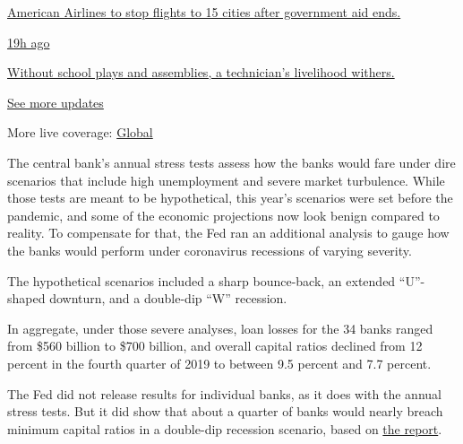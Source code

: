 \href{https://www.nytimes3xbfgragh.onion/live/2020/08/20/business/stock-market-today-coronavirus?action=click\&pgtype=Article\&state=default\&region=MAIN_CONTENT_1\&context=storylines_live_updates\#american-airlines-to-stop-flights-to-15-cities-after-government-aid-ends}{American
Airlines to stop flights to 15 cities after government aid ends.}

\href{https://www.nytimes3xbfgragh.onion/live/2020/08/20/business/stock-market-today-coronavirus?action=click\&pgtype=Article\&state=default\&region=MAIN_CONTENT_1\&context=storylines_live_updates\#without-school-plays-and-assemblies-a-technicians-livelihood-withers}{19h
ago}

\href{https://www.nytimes3xbfgragh.onion/live/2020/08/20/business/stock-market-today-coronavirus?action=click\&pgtype=Article\&state=default\&region=MAIN_CONTENT_1\&context=storylines_live_updates\#without-school-plays-and-assemblies-a-technicians-livelihood-withers}{Without
school plays and assemblies, a technician's livelihood withers.}

\href{https://www.nytimes3xbfgragh.onion/live/2020/08/20/business/stock-market-today-coronavirus?action=click\&pgtype=Article\&state=default\&region=MAIN_CONTENT_1\&context=storylines_live_updates}{See
more updates}

More live coverage:
\href{https://www.nytimes3xbfgragh.onion/2020/08/20/world/coronavirus-covid.html?action=click\&pgtype=Article\&state=default\&region=MAIN_CONTENT_1\&context=storylines_live_updates}{Global}

The central bank's annual stress tests assess how the banks would fare
under dire scenarios that include high unemployment and severe market
turbulence. While those tests are meant to be hypothetical, this year's
scenarios were set before the pandemic, and some of the economic
projections now look benign compared to reality. To compensate for that,
the Fed ran an additional analysis to gauge how the banks would perform
under coronavirus recessions of varying severity.

The hypothetical scenarios included a sharp bounce-back, an extended
``U''-shaped downturn, and a double-dip ``W'' recession.

In aggregate, under those severe analyses, loan losses for the 34 banks
ranged from \$560 billion to \$700 billion, and overall capital ratios
declined from 12 percent in the fourth quarter of 2019 to between 9.5
percent and 7.7 percent.

The Fed did not release results for individual banks, as it does with
the annual stress tests. But it did show that about a quarter of banks
would nearly breach minimum capital ratios in a double-dip recession
scenario, based on
\href{https://www.nytimes3xbfgragh.onion/2020/06/25/business/economy/fed-limits-bank-payouts-and-suspends-share-buybacks-as-pandemic-grinds-on.html}{the
report}.

